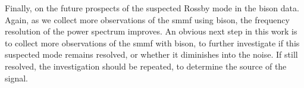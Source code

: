 

Finally, on the future prospects of the suspected Rossby mode in the \gls{bison} data. Again, as we collect more observations of the \gls{smmf} using \gls{bison}, the frequency resolution of the power spectrum improves. An obvious next step in this work is to collect more observations of the \gls{smmf} with \gls{bison}, to further investigate if this suspected mode remains resolved, or whether it diminishes into the noise. If still resolved, the investigation should be repeated, to determine the source of the signal.